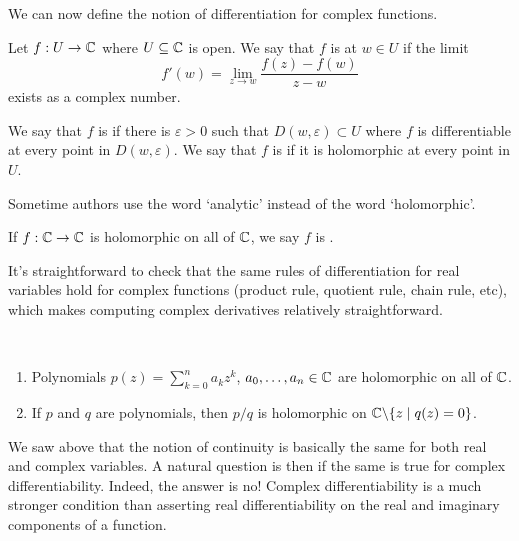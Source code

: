 \documentclass[a4paper]{scrartcl}
\begin{document}
We can now define the notion of differentiation for complex functions.

\begin{definition}
    Let $f: U \rightarrow \mathbb{C}$ where $U \subseteq \mathbb{C}$ is open.   
    We say that $f$ is  at $w \in U$ if the limit
    $$
    f'(w) = \lim_{z \to w} \frac{f(z) - f(w)}{z - w}
    $$
    exists as a complex number.
\end{definition}
\begin{definition}[Holomorphic]
    We say that $f$ is  if there is $\varepsilon > 0$ such that $D(w, \varepsilon) \subset U$ where $f$ is differentiable at every point in $D(w, \varepsilon)$. We say that $f$ is  if it is holomorphic at every point in $U$.
\end{definition}

\begin{remark}
    Sometime authors use the word `analytic' instead of the word `holomorphic'.
\end{remark}

\begin{definition}[Entire]
    If $f: \mathbb{C} \rightarrow \mathbb{C}$ is holomorphic on all of $\mathbb{C}$, we say $f$ is .
\end{definition}



It's straightforward to check that the same rules of differentiation for real variables hold for complex functions (product rule, quotient rule, chain rule, etc), which makes computing complex derivatives relatively straightforward.

\begin{example}~
    \vspace*{-1.5\baselineskip}
\begin{enumerate}[label=(\roman*)]
    \item Polynomials $p(z) = \sum_{k = 0}^n a_k z^k$, $a_0, \dots, a_n \in \mathbb{C}$ are holomorphic on all of $\mathbb{C}$.
    \item If $p$ and $q$ are polynomials, then $p/q$ is holomorphic on $\mathbb{C} \backslash \{z \mid q(z) = 0\}$.
\end{enumerate}
\end{example}
    
We saw above that the notion of continuity is basically the same for both real and complex variables. A natural question is then if the same is true for complex differentiability.
Indeed, the answer is no! Complex differentiability is a much stronger condition than asserting real differentiability on the real and imaginary components of a function.
\end{document}
